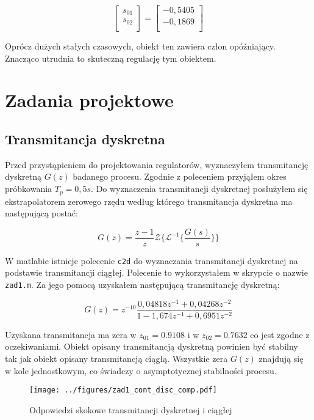 \documentclass[a4paper,titlepage,11pt,floatssmall]{mwrep}
\begin{document}
$$
\left[\begin{array}{c}
s_{01} \\
s_{02} \\
\end{array} \right]
= 
\left[\begin{array}{c}
-0,5405	\\
-0,1869 \\
\end{array} \right]
$$

Oprócz dużych stałych czasowych, obiekt ten zawiera człon opóźniający. Znacząco utrudnia to skuteczną regulację tym obiektem.

\chapter{Zadania projektowe}
\section{Transmitancja dyskretna}
Przed przystąpieniem do projektowania regulatorów, wyznaczyłem transmitancję dyskretną $G(z)$ badanego procesu. Zgodnie z poleceniem przyjąłem okres próbkowania $T_p = 0,5s$. Do wyznaczenia transmitancji dyskretnej posłużyłem się ekstrapolatorem zerowego rzędu według którego transmitancja dyskretna ma następującą postać:

\begin{equation*}
G(z) = \frac{z-1}{z} \mathcal{Z} \bigg\{ \mathcal{L}^{-1} \bigg\{ \frac{G(s)}{s} \bigg\} \bigg\}  
\end{equation*}

W matlabie istnieje polecenie \texttt{c2d} do wyznaczania transmitancji dyskretnej na podstawie transmitancji ciągłej. Polecenie to wykorzystałem w skrypcie o nazwie \texttt{zad1.m}. Za jego pomocą uzyskałem następującą transmitancję dyskretną:

\begin{equation*}
G(z) = z^{-10}\frac{0,04818z^{-1} + 0,04268z^{-2}}{1 - 1,674z^{-1} + 0,6951z^{-2}}
\end{equation*} 

Uzyskana transmitancja ma zera w $z_{01} = 0.9108$ i w $z_{02} = 0.7632$ co jest zgodne z oczekiwaniami. Obiekt opisany transmitancją dyskretną powinien być stabilny tak jak obiekt opisany transmitancją ciągłą. Wszystkie zera $G(z)$ znajdują się w kole jednostkowym, co świadczy o asymptotycznej stabilności procesu.

\begin{figure}[H]
\centering
\texttt{[image: ../figures/zad1\_cont\_disc\_comp.pdf]}
\caption{Odpowiedzi skokowe transmitancji dyskretnej i ciągłej}
\end{figure}
\end{document}

